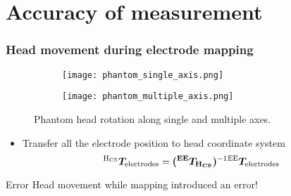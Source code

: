 \section{Accuracy of measurement}
\begin{frame}
	\frametitle{Head movement during electrode mapping}
	\begin{figure}[hbt!]
		\centering
		\begin{subfigure}{0.49\textwidth}
			\texttt{[image: phantom\_single\_axis.png]}	
		\end{subfigure}
		\hfill
		\begin{subfigure}{0.49\textwidth}
			\texttt{[image: phantom\_multiple\_axis.png]}	
		\end{subfigure}
		\caption{Phantom head rotation along single and multiple axes.} 
		\label{fig:phantom_multiple_axis}
	\end{figure} 
	\begin{itemize}
		\item Transfer all the electrode position to head coordinate system
		\begin{equation*}
		{}^\mathrm{H_{CS}} \bm{T}_\mathrm{electrodes} = \bm{({}^\mathrm{EE} \bm{T}_\mathrm{H_{CS}})}^{-1} {}^\mathrm{EE} \bm{T}_\mathrm{electrodes}
		\end{equation*}
	\end{itemize}

\begin{block}{Error}
	Head movement while mapping introduced an error!
\end{block}
	
\end{frame}


